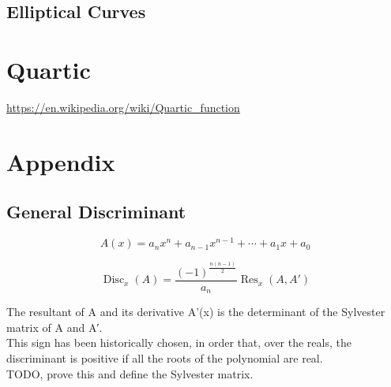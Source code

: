 \documentclass[a4paper]{article}
\begin{document}
\subsection{Elliptical Curves}

\section{Quartic}
\url{https://en.wikipedia.org/wiki/Quartic_function}

\section{Appendix}

\subsection{General Discriminant}

$$
A(x) = a_nx^n+a_{n-1}x^{n-1}+\cdots+a_1x+a_0
$$

$$
\operatorname{Disc}_x(A) = \frac{(-1)^\frac{n(n-1)}{2}}{a_n}\operatorname{Res}_x(A,A')
$$

The resultant of A and its derivative A'(x) is the determinant of the Sylvester matrix of A and A′.
\\
This sign has been historically chosen, in order that, over the reals, the discriminant is positive if all the roots of the polynomial are real.
\\
TODO, prove this and define the Sylvester matrix.
\end{document}
